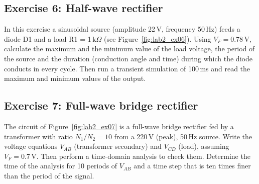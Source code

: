 

\subsection{Exercise 6: Half-wave rectifier}
In this exercise a sinusoidal source (amplitude 22\,V, frequency 50\,Hz) feeds a diode D1 and a load R1 = 1\,k$\Omega$ (see Figure~\ref{fig:lab2_ex06}). Using $V_F=0.78$\,V, calculate the maximum and the minimum value of the load voltage, the period of the source and the duration (conduction angle and time) during which the diode conducts in every cycle. Then run a transient simulation of 100\,ms and read the maximum and minimum values of the output.






\subsection{Exercise 7: Full-wave bridge rectifier}
The circuit of Figure~\ref{fig:lab2_ex07} is a full-wave bridge rectifier fed by a transformer with ratio $N_1/N_2=10$ from a 220\,V (peak), 50\,Hz source. Write the voltage equations $V_{AB}$ (transformer secondary) and $V_{CD}$ (load), assuming $V_F=0.7$\,V. Then perform a time-domain analysis to check them. Determine the time of the analysis for 10 periods of $V_{AB}$ and a time step that is ten times finer than the period of the signal.

